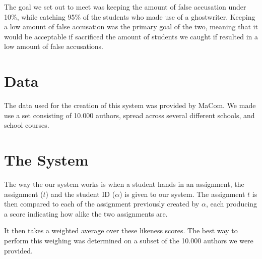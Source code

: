 \documentclass[11pt]{article}
\begin{document}
    The goal we set out to meet was keeping the amount of false accusation under
    10\%, while catching 95\% of the students who made use of a ghostwriter.
    Keeping a low amount of false accusation was the primary goal of the two,
    meaning that it would be acceptable if sacrificed the amount of students we
    caught if resulted in a low amount of false accusations.

    \section{Data}
    The data used for the creation of this system was provided by MaCom.
    We made use a set consisting of 10.000 authors, spread across several
    different schools, and school courses.


     
    \section{The System}
    
    The way the our system works is when a student hands in an assignment,
    the assignment ($t$) and the student ID ($\alpha$) is given to our system.
    The assignment $t$ is then compared to each of the assignment previously
    created by $\alpha$, each producing a score indicating how alike the two
    assignments are.

    It then takes a weighted average over these likeness scores. 
    The best way to perform this weighing was determined on a subset of
    the 10.000 authors we were provided.
\end{document}
